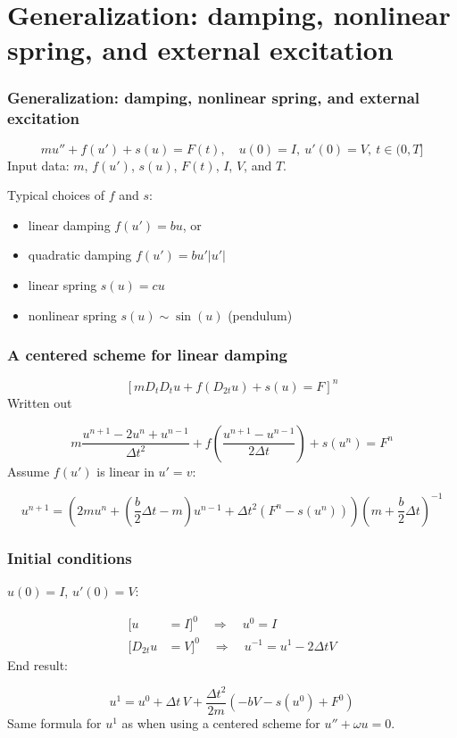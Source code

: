 \documentclass{beamer}
\begin{document}
\section{Generalization: damping, nonlinear spring, and external excitation}

\begin{frame}
\frametitle{Generalization: damping, nonlinear spring, and external excitation}

\label{vib:model2}

\[
mu'' + f(u') + s(u) = F(t),\quad u(0)=I,\ u'(0)=V,\ t\in (0,T]
\]
Input data: $m$, $f(u')$, $s(u)$, $F(t)$, $I$, $V$, and $T$.

Typical choices of $f$ and $s$:

\begin{itemize}
 \item linear damping $f(u')=bu$, or

 \item quadratic damping $f(u')=bu'|u'|$

 \item linear spring $s(u)=cu$

 \item nonlinear spring $s(u)\sim \sin(u)$ (pendulum)
\end{itemize}

\noindent

\end{frame}

\begin{frame}
\frametitle{A centered scheme for linear damping}

\label{vib:ode2:fdm:flin}

\[
[mD_tD_t u + f(D_{2t}u) + s(u) = F]^n
\]
Written out

\[
m\frac{u^{n+1}-2u^n + u^{n-1}}{\Delta t^2}
+ f(\frac{u^{n+1}-u^{n-1}}{2\Delta t}) + s(u^n) = F^n
\]
Assume $f(u')$ is linear in $u'=v$:

\[
u^{n+1} = \left(2mu^n + (\frac{b}{2}\Delta t - m)u^{n-1} +
\Delta t^2(F^n - s(u^n))
\right)(m + \frac{b}{2}\Delta t)^{-1}
\]
\end{frame}

\begin{frame}
\frametitle{Initial conditions}

$u(0)=I$, $u'(0)=V$:

\begin{align*}
\lbrack u &=I\rbrack^0\quad\Rightarrow\quad u^0=I\\ 
\lbrack D_{2t}u &=V\rbrack^0\quad\Rightarrow\quad u^{-1} = u^{1} - 2\Delta t V
\end{align*}
End result:

\[
u^1 = u^0 + \Delta t\, V
+ \frac{\Delta t^2}{2m}(-bV - s(u^0) + F^0)
\]
Same formula for $u^1$ as when using a centered scheme for $u''+\omega u=0$.
\end{frame}
\end{document}
